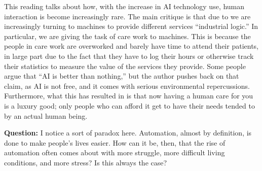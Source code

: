 This reading talks about how, with the increase in AI technology use, human interaction is become increasingly rare.
The main critique is that due to we are increasingly turning to machines to provide different services ``industrial logic.''
In particular, we are giving the task of care work to machines.
This is because the people in care work are overworked and barely have time to attend their patients, in large part due to the fact that they have to log their hours or otherwise track their statistics to measure the value of the services they provide.
Some people argue that ``AI is better than nothing,'' but the author pushes back on that claim, as AI is not free, and it comes with serious environmental repercussions.
Furthermore, what this has resulted in is that now having a human care for you is a luxury good;
only people who can afford it get to have their needs tended to by an actual human being.

\textbf{Question:}
I notice a sort of paradox here.
Automation, almost by definition, is done to make people's lives easier.
How can it be, then, that the rise of automation often comes about with more struggle, more difficult living conditions, and more stress?
Is this always the case?

